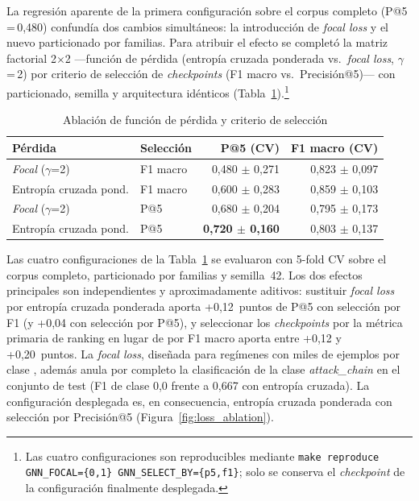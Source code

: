 La regresión aparente de la primera configuración sobre el corpus completo
(P@5\,=\,0,480) confundía dos cambios simultáneos: la introducción de
\textit{focal loss} \citep{Lin2017} y el nuevo particionado por familias. Para
atribuir el efecto se completó la matriz factorial 2\(\times\)2 —función de
pérdida (entropía cruzada ponderada vs.\ \textit{focal loss},
\(\gamma\)\,=\,2) por criterio de selección de \textit{checkpoints} (F1 macro
vs.\ Precisión@5)— con particionado, semilla y arquitectura idénticos
(Tabla~\ref{tab:loss_ablation}).\footnote{Las cuatro configuraciones son reproducibles
mediante \texttt{make reproduce GNN\_FOCAL=\{0,1\} GNN\_SELECT\_BY=\{p5,f1\}}; solo se
conserva el \textit{checkpoint} de la configuración finalmente desplegada.}

\begin{table}[htbp]
\centering
\caption{Ablación de función de pérdida y criterio de selección}
\label{tab:loss_ablation}
\begin{tabular}{@{}llrr@{}}
\toprule
Pérdida & Selección & P@5 (\acs{CV}) & F1 macro (\acs{CV}) \\
\midrule
\textit{Focal} (\(\gamma\)=2) & F1 macro & 0,480 \(\pm\) 0,271 & 0,823 \(\pm\) 0,097 \\
Entropía cruzada pond. & F1 macro & 0,600 \(\pm\) 0,283 & 0,859 \(\pm\) 0,103 \\
\textit{Focal} (\(\gamma\)=2) & P@5 & 0,680 \(\pm\) 0,204 & 0,795 \(\pm\) 0,173 \\
Entropía cruzada pond. & P@5 & \textbf{0,720 \(\pm\) 0,160} & 0,803 \(\pm\) 0,137 \\
\bottomrule
\end{tabular}
\fuentepropia
\end{table}

Las cuatro configuraciones de la Tabla~\ref{tab:loss_ablation} se evaluaron con
5-fold \ac{CV} sobre el corpus completo, particionado por familias y semilla~42.
Los dos efectos principales son independientes y aproximadamente aditivos:
sustituir \textit{focal loss} por entropía cruzada ponderada aporta
+0,12~puntos de P@5 con selección por F1 (y +0,04 con selección por P@5), y
seleccionar los \textit{checkpoints} por la métrica primaria de ranking en lugar
de por F1 macro aporta entre +0,12 y +0,20~puntos. La \textit{focal loss},
diseñada para regímenes con miles de ejemplos por clase \citep{Lin2017}, además
anula por completo la clasificación de la clase \textit{attack\_chain} en el
conjunto de test (F1 de clase 0,0 frente a 0,667 con entropía cruzada). La
configuración desplegada es, en consecuencia, entropía cruzada ponderada con
selección por Precisión@5 (Figura~\ref{fig:loss_ablation}).

